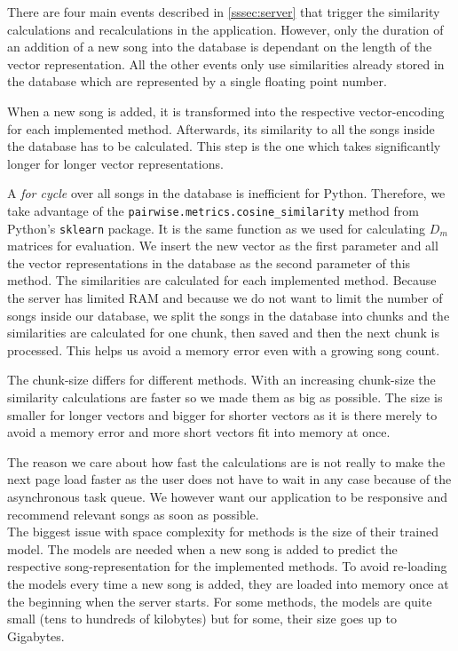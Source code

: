 There are four main events described in \ref{sssec:server} that trigger the similarity calculations and recalculations in the application. However, only the duration of an addition of a new song into the database is dependant on the length of the vector representation. All the other events only use similarities already stored in the database which are represented by a single floating point number.

When a new song is added, it is transformed into the respective vector-encoding for each implemented method. Afterwards, its similarity to all the songs inside the database has to be calculated. This step is the one which takes significantly longer for longer vector representations. 

A \textit{for cycle} over all songs in the database is inefficient for Python. Therefore, we take advantage of the \texttt{pairwise.metrics.cosine\_similarity} method from Python's \texttt{sklearn} package. It is the same function as we used for calculating $D_m$ matrices for evaluation. 
We insert the new vector as the first parameter and all the vector representations in the database as the second parameter of this method. The similarities are calculated for each implemented method. Because the server has limited RAM and because we do not want to limit the number of songs inside our database, we split the songs in the database into chunks and the similarities are calculated for one chunk, then saved and then the next chunk is processed. This helps us avoid a memory error even with a growing song count.

The chunk-size differs for different methods. With an increasing chunk-size the similarity calculations are faster so we made them as big as possible. The size is smaller for longer vectors and bigger for shorter vectors as it is there merely to avoid a memory error and more short vectors fit into memory at once. 

The reason we care about how fast the calculations are is not really to make the next page load faster as the user does not have to wait in any case because of the asynchronous task queue. We however want our application to be responsive and recommend relevant songs as soon as possible. \\

The biggest issue with space complexity for methods is the size of their trained model. The models are needed when a new song is added to predict the respective song-representation for the implemented methods. To avoid re-loading the models every time a new song is added, they are loaded into memory once at the beginning when the server starts. For some methods, the models are quite small (tens to hundreds of kilobytes) but for some, their size goes up to Gigabytes.

